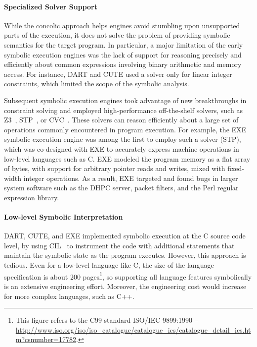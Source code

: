 \paragraph{Specialized Solver Support}


While the concolic approach helps engines avoid stumbling upon unsupported parts of the execution, it does not solve the problem of providing symbolic semantics for the target program.
%
In particular, a major limitation of the early symbolic execution engines was the lack of support for reasoning precisely and efficiently about common expressions involving binary arithmetic and memory access.  For instance, DART and CUTE used a solver only for linear integer constraints, which limited the scope of the symbolic analysis.

Subsequent symbolic execution engines took advantage of new breakthroughs in constraint solving and employed high-performance off-the-shelf solvers, such as Z3~\cite{Z3}, STP~\cite{stp}, or CVC~\cite{cvc}.  These solvers can reason efficiently about a large set of operations commonly encountered in program execution.
%
For example, the EXE~\cite{exe} symbolic execution engine was among the first to employ such a solver (STP), which was co-designed with EXE to accurately express machine operations in low-level languages such as C.
%
EXE modeled the program memory as a flat array of bytes, with support for arbitrary pointer reads and writes, mixed with fixed-width integer operations.
%
As a result, EXE targeted and found bugs in larger system software such as the  DHPC server, packet filters, and the  Perl regular expression library.

\paragraph{Low-level Symbolic Interpretation}

DART, CUTE, and EXE implemented symbolic execution at the C source code level, by using CIL~\cite{cil} to instrument the code with additional statements that maintain the symbolic state as the program executes.
%
However, this approach is tedious.  Even for a low-level language like C, the size of the language specification is about 200 pages\footnote{This figure refers to the C99 standard ISO/IEC 9899:1990 -- {\url{http://www.iso.org/iso/iso_catalogue/catalogue_ics/catalogue_detail_ics.htm?csnumber=17782}}.}, so supporting all language features symbolically is an extensive engineering effort.  Moreover, the engineering cost would increase for more complex languages, such as C++.

